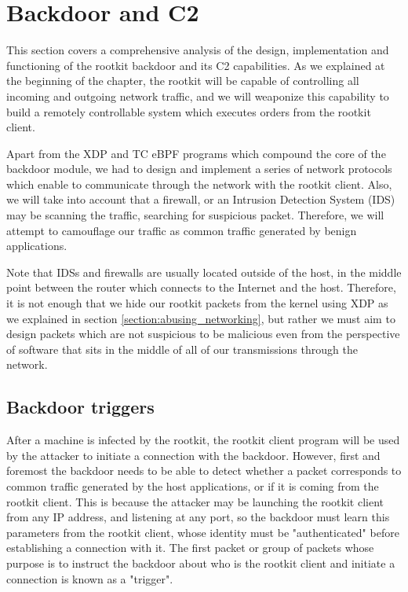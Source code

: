 \section{Backdoor and C2}
This section covers a comprehensive analysis of the design, implementation and functioning of the rootkit backdoor and its C2 capabilities. As we explained at the beginning of the chapter, the rootkit will be capable of controlling all incoming and outgoing network traffic, and we will weaponize this capability to build a remotely controllable system which executes orders from the rootkit client.

Apart from the XDP and TC eBPF programs which compound the core of the backdoor module, we had to design and implement a series of network protocols which enable to communicate through the network with the rootkit client. Also, we will take into account that a firewall, or an Intrusion Detection System (IDS) \cite{ips} may be scanning the traffic, searching for suspicious packet. Therefore, we will attempt to camouflage our traffic as common traffic generated by benign applications. 

Note that IDSs and firewalls are usually located outside of the host, in the middle point between the router which connects to the Internet and the host. Therefore, it is not enough that we hide our rootkit packets from the kernel using XDP as we explained in section \ref{section:abusing_networking}, but rather we must aim to design packets which are not suspicious to be malicious even from the perspective of software that sits in the middle of all of our transmissions through the network.

\subsection{Backdoor triggers} \label{subsection:triggers}
After a machine is infected by the rootkit, the rootkit client program will be used by the attacker to initiate a connection with the backdoor. However, first and foremost the backdoor needs to be able to detect whether a packet corresponds to common traffic generated by the host applications, or if it is coming from the rootkit client. This is because the attacker may be launching the rootkit client from any IP address, and listening at any port, so the backdoor must learn this parameters from the rootkit client, whose identity must be "authenticated" before establishing a connection with it. The first packet or group of packets whose purpose is to instruct the backdoor about who is the rootkit client and initiate a connection is known as a "trigger".

